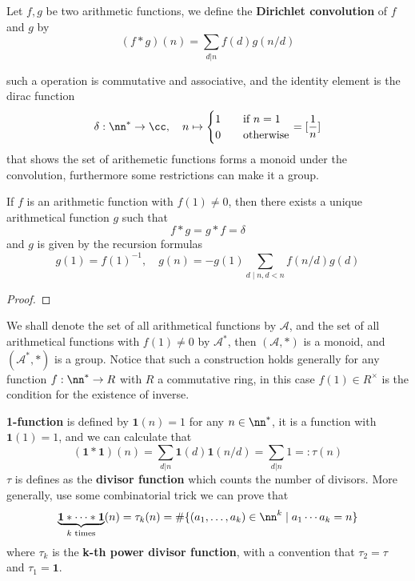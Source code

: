 \begin{definition}
    Let \(f,g\) be two arithmetic functions, we define the \textbf{Dirichlet convolution} of \(f\) and \(g\) by
\[(f * g)(n) = \sum_{d|n} f(d)g(n/d)\]
\end{definition}

such a operation is commutative and associative, and the identity element is the dirac function
\[\delta: \nn^* \to \cc, \quad n \mapsto \begin{cases}
    1 \quad &\text{if } n = 1\\
    0 \quad &\text{otherwise}
\end{cases} = [\frac{1}{n}]\]
that shows the set of arithemetic functions forms a monoid under the convolution, furthermore some restrictions can make it a group.

\begin{colorproposition}
    If \(f\) is an arithmetic function with \(f(1) \neq 0\), then there exists a unique arithmetical function \(g\) such that 
    \[f*g = g* f = \delta\]
    and \(g\) is given by the recursion formulas
    \[g(1) = f(1)^{-1}, \quad g(n) = -g(1) \sum_{d \mid n, d<n} f(n/d)g(d)\]
\end{colorproposition}
\begin{proof}
    
\end{proof}

\begin{remark}
    We shall denote the set of all arithmetical functions by \(\mathcal{A}\), and the set of all arithmetical functions with \(f(1) \neq 0\) by \(\mathcal{A}^*\), then \((\mathcal{A}, *)\) is a monoid, and \((\mathcal{A}^*, *)\) is a group. Notice that such a construction holds generally for any function \(f: \nn^* \to R\) with \(R\) a commutative ring, in this case \(f(1) \in R^\times\) is the condition for the existence of inverse.
\end{remark}

\begin{example}
    \textbf{1-function} is defined by \(\mathbf{1}(n) = 1\) for any \(n \in \nn^*\), it is a function with \(\mathbf{1}(1) = 1\), and we can calculate that 
    \[(\mathbf{1} * \mathbf{1})(n) = \sum_{d|n} \mathbf{1}(d)\mathbf{1}(n/d) = \sum_{d|n} 1 =: \tau(n)\]
    \(\tau\) is defines as the \textbf{divisor function} which counts the number of divisors. More generally, use some combinatorial trick we can prove that 
    \[\underbrace{\mathbf{1} * \cdots *\mathbf{1}}_{k \text{ times}} (n) = \tau_k(n) = \# \{(a_1,\dots,a_k) \in \nn^k \mid a_1 \cdots a_k = n\} \]
    where \(\tau_k\) is the \textbf{k-th power divisor function}, with a convention that \(\tau_2 = \tau\) and \(\tau_1 = \mathbf{1}\).
    
\end{example}

